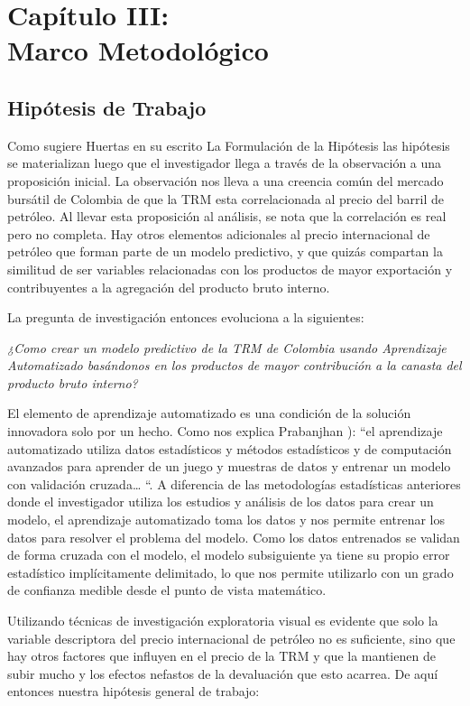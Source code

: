 \setcounter{chapter}{2}
\chapter{Capítulo III: \\Marco Metodológico}
\thispagestyle{empty}

\section{Hipótesis de Trabajo }
Como sugiere Huertas en su escrito La Formulación de la Hipótesis \cite{huertas} las hipótesis se materializan luego que el investigador llega a través de la observación a una proposición inicial. La observación nos lleva a una creencia común del mercado bursátil de Colombia de que la TRM esta correlacionada al precio del barril de petróleo. Al llevar esta proposición al análisis, se nota que la correlación es real pero no completa. Hay otros elementos adicionales al precio internacional de petróleo que forman parte de un modelo predictivo, y que quizás compartan la similitud de ser variables relacionadas con los productos de mayor exportación y contribuyentes a la agregación del producto bruto interno.

La pregunta de investigación entonces evoluciona a la siguientes:

\emph{¿Como crear un modelo predictivo de la TRM de Colombia usando Aprendizaje Automatizado basándonos en los productos de mayor contribución a la canasta del producto bruto interno?}

El elemento de aprendizaje automatizado es una condición de la solución innovadora solo por un hecho. Como nos explica Prabanjhan \cite{narayanachar}): “el aprendizaje automatizado utiliza datos estadísticos y métodos estadísticos y de computación avanzados para aprender de un juego y muestras de datos y entrenar un modelo con validación cruzada… “. A diferencia de las metodologías estadísticas anteriores donde el investigador utiliza los estudios y análisis de los datos para crear un modelo, el aprendizaje automatizado toma los datos y nos permite entrenar los datos para resolver el problema del modelo. Como los datos entrenados se validan de forma cruzada con el modelo, el modelo subsiguiente ya tiene su propio error estadístico implícitamente delimitado, lo que nos permite utilizarlo con un grado de confianza medible desde el punto de vista matemático.

Utilizando técnicas de investigación exploratoria visual es evidente que solo la variable descriptora del precio internacional de petróleo no es suficiente, sino que hay otros factores que influyen en el precio de la TRM y que la mantienen de subir mucho y los efectos nefastos de la devaluación que esto acarrea. De aquí entonces nuestra hipótesis general de trabajo:

